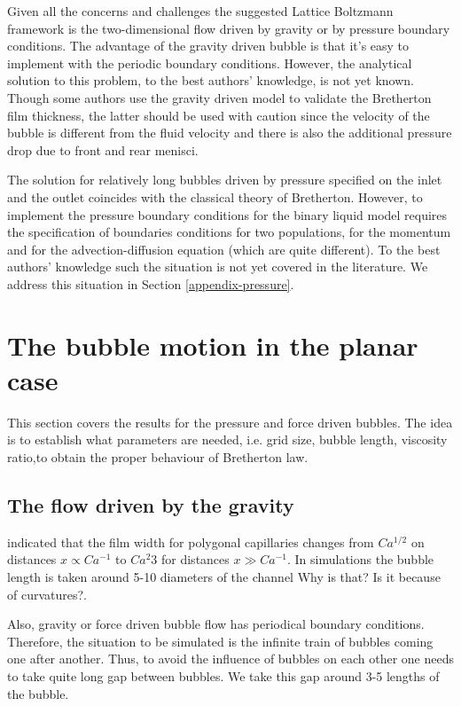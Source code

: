 \documentclass{article}
\begin{document}
Given all the concerns and challenges the suggested Lattice Boltzmann framework
is the two-dimensional flow driven by gravity or by pressure boundary
conditions. The advantage of the gravity driven bubble is that it's easy to
implement with the periodic boundary conditions. However, the analytical
solution to this problem, to the best authors' knowledge, is not yet known.
Though some authors \cite{sehgal-microchannel} use the gravity driven model to
validate the Bretherton film thickness, the latter should be used with caution
since the velocity of the bubble is different from the fluid velocity and there
is also the additional pressure drop due to front and rear menisci. 

The solution
for relatively long bubbles driven by pressure specified on the inlet and the
outlet coincides with the classical theory of Bretherton. However, to implement
the pressure boundary conditions for the binary liquid model requires the
specification of boundaries conditions for two populations, for the momentum and
for the advection-diffusion equation (which are quite different). To the best
authors' knowledge such the situation is not yet covered in the literature. We
address this situation in Section \ref{appendix-pressure}. 

\section{The bubble motion in the planar case}
This section covers the results for the pressure and force driven bubbles. The
idea is to establish what parameters are needed, i.e. grid size, bubble length,
viscosity ratio,to obtain the proper behaviour of Bretherton law.  

\subsection{The flow driven by the gravity}
\citet{wong-films} indicated that the film width for polygonal capillaries
changes from $Ca^{1/2}$ on distances $x\propto Ca^{-1}$ to $Ca^{2}{3}$ for
distances $x \gg Ca^{-1}$. In simulations the bubble length is taken around 5-10
diameters of the channel {\color{red} Why is that? Is it because of
curvatures?}. 

Also, gravity or force driven bubble flow has periodical boundary conditions.
Therefore, the situation to be simulated is the infinite train of bubbles
coming one after another. Thus, to avoid the influence of bubbles on each other
one needs to take quite long gap between bubbles. We take this gap around 3-5
lengths of the bubble.
\end{document}
